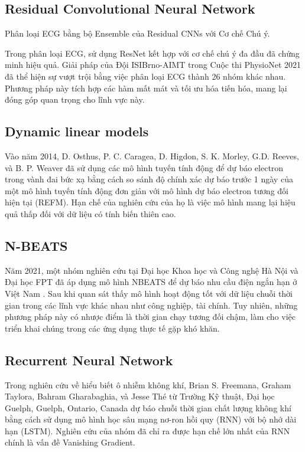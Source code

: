 \documentclass[conference]{IEEEtran}
\begin{document}
\subsection{Residual Convolutional Neural Network}
Phân loại ECG bằng bộ Ensemble của Residual CNNs với Cơ chế Chú ý.

Trong phân loại ECG, sử dụng ResNet kết hợp với cơ chế chú ý đa đầu đã chứng minh hiệu quả. Giải pháp của Đội ISIBrno-AIMT trong Cuộc thi PhysioNet 2021 đã thể hiện sự vượt trội bằng việc phân loại ECG thành 26 nhóm khác nhau. Phương pháp này tích hợp các hàm mất mát và tối ưu hóa tiến hóa, mang lại đóng góp quan trọng cho lĩnh vực này. \cite{b4}

\subsection{Dynamic linear models}
Vào năm 2014, D. Osthus, P. C. Caragea, D. Higdon, S. K. Morley, G.D. Reeves, và B. P. Weaver đã sử dụng các mô hình tuyến tính động để dự báo electron trong vành đai bức xạ bằng cách so sánh độ chính xác dự báo trước 1 ngày của một mô hình tuyến tính động đơn giản với mô hình dự báo electron tương đối hiện tại (REFM)\cite{b6}. Hạn chế của nghiên cứu của họ là việc mô hình mang lại hiệu quả thấp đối với dữ liệu có tính biến thiên cao.

\subsection{N-BEATS}
Năm 2021, một nhóm nghiên cứu tại Đại học Khoa học và Công nghệ Hà Nội và Đại học FPT đã áp dụng mô hình NBEATS để dự báo nhu cầu điện ngắn hạn ở Việt Nam \cite{b7}. Sau khi quan sát thấy mô hình hoạt động tốt với dữ liệu chuỗi thời gian trong các lĩnh vực khác nhau như công nghiệp, tài chính. Tuy nhiên, những phương pháp này có nhược điểm là thời gian chạy tương đối chậm, làm cho việc triển khai chúng trong các ứng dụng thực tế gặp khó khăn.

\subsection{Recurrent Neural Network}
Trong nghiên cứu về hiểu biết ô nhiễm không khí, Brian S. Freemana, Graham Taylora, Bahram Gharabaghia, và Jesse Thé từ Trường Kỹ thuật, Đại học Guelph, Guelph, Ontario, Canada dự báo chuỗi thời gian chất lượng không khí bằng cách sử dụng mô hình học sâu mạng nơ-ron hồi quy (RNN) với bộ nhớ dài hạn (LSTM)\cite{b10}. Nghiên cứu của nhóm đã chỉ ra được hạn chế lớn nhất của RNN chính là vấn đề Vanishing Gradient.
\end{document}

